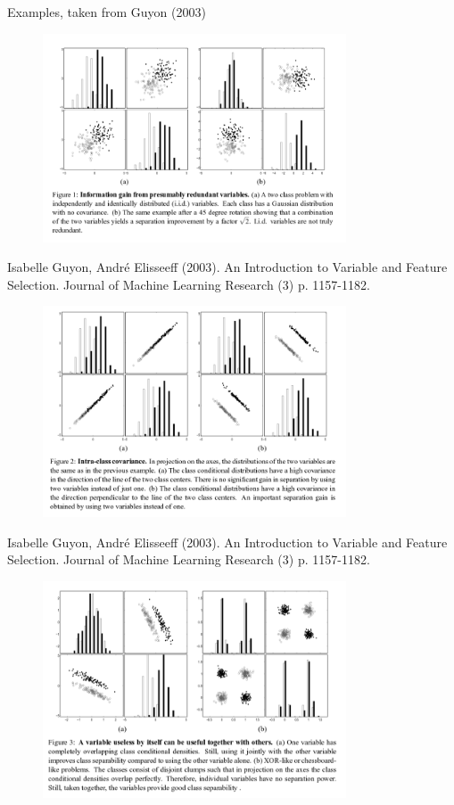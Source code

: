 \begin{vbframe}{Examples, taken from Guyon (2003)}

\begin{figure}
  \includegraphics[width=9cm]{figure_man/varsel_ex0.png}
\end{figure}

\begin{center}
\footnotesize{Isabelle Guyon, André Elisseeff (2003). An Introduction to Variable and Feature Selection.  Journal of Machine Learning Research (3) p. 1157-1182.}
\end{center}

\framebreak

\begin{figure}
  \includegraphics[width=9cm]{figure_man/varsel_ex1.png}
\end{figure}

\begin{center}
\footnotesize{Isabelle Guyon, André Elisseeff (2003). An Introduction to Variable and Feature Selection.  Journal of Machine Learning Research (3) p. 1157-1182.}
\end{center}

\framebreak

\begin{figure}
  \includegraphics[width=9cm]{figure_man/varsel_ex2.png}
\end{figure}


\end{vbframe}
